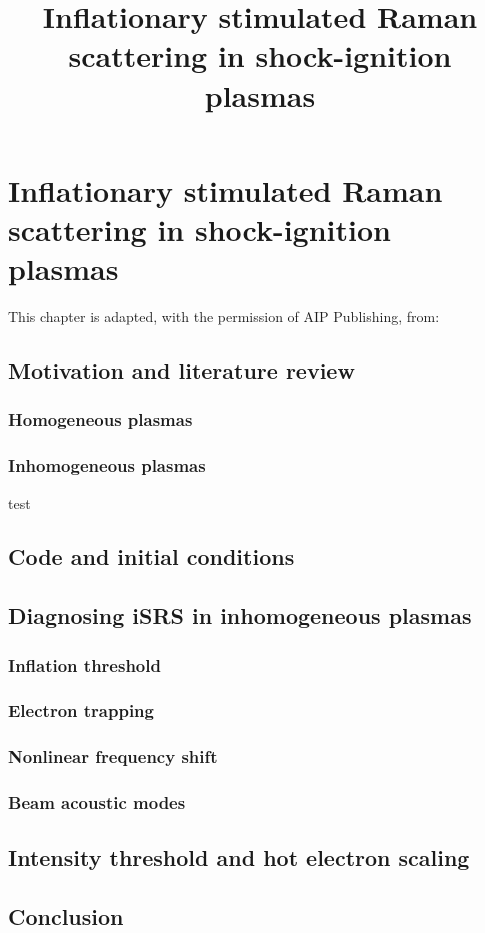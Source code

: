 
\chapter{Inflationary stimulated Raman scattering in shock-ignition plasmas}
\label{chp:iSRS}

\nobibliography*

\title{Inflationary stimulated Raman scattering in shock-ignition plasmas}

This chapter is adapted, with the permission of AIP Publishing, from:
\newline {}

\section{Motivation and literature review}
\subsection{Homogeneous plasmas}
\subsection{Inhomogeneous plasmas}
test\cite{Vu2001}


\section{Code and initial conditions}\label{sec:code&IC}

\section{Diagnosing iSRS in inhomogeneous plasmas}\label{sec:signatures}
\subsection{Inflation threshold}
\subsection{Electron trapping}
\subsection{Nonlinear frequency shift}
\subsection{Beam acoustic modes}

\section{Intensity threshold and hot electron scaling}\label{sec:paramScan}

\section{Conclusion}\label{sec:conclusion}


